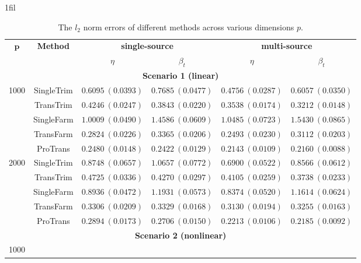\documentclass[12pt]{article}
\makeatletter
\newcommand*{\centerfloat}{%
  \parindent \z@
  \leftskip \z@ \@plus 1fil \@minus \marginparwidth
  \rightskip \leftskip
  \parfillskip \z@skip}
\makeatother
\begin{document}
\begin{table}[!ht]
\renewcommand{\arraystretch}{0.65}
\footnotesize
    \centerfloat
    \caption{The $l_2$ norm errors of different methods across various dimensions $p$.}
    \label{table: simulation_p}
    \begin{tabular}{cccccc}
        \toprule
        \multirow{2}{*}{$\bm{p}$} & \multirow{2}{*}{\textbf{Method}} & \multicolumn{2}{c}{\textbf{single-source}} & \multicolumn{2}{c}{\textbf{multi-source}}\\
        \cmidrule(lr){3-4} \cmidrule(lr){5-6} 
        & & $\eta$ & $\beta_{t}$ & $\eta$& $\beta_{t}$ \\
        \midrule
        \multicolumn{6}{c}{\textbf{Scenario 1 (linear)}}\\
        \hline
        \multirow{5}{*}{1000} 
        & SingleTrim  & $0.6095\ (0.0393)$ & $0.7685\ (0.0477)$ & $0.4756\ (0.0287)$ & $0.6057\ (0.0350)$ \\
        & TransTrim   & $0.4246\ (0.0247)$ & $0.3843\ (0.0220)$ & $0.3538\ (0.0174)$ & $0.3212\ (0.0148)$ \\
        & SingleFarm  & $1.0009\ (0.0490)$ & $1.4586\ (0.0609)$ & $1.0485\ (0.0723)$ & $1.5430\ (0.0865)$ \\
        & TransFarm   & $0.2824\ (0.0226)$ & $0.3365\ (0.0206)$ & $0.2493\ (0.0230)$ & $0.3112\ (0.0203)$ \\
        & ProTrans    & $\bm{0.2480}\ (0.0148)$ & $\bm{0.2422}\ (0.0129)$ & $\bm{0.2143}\ (0.0109)$ & $\bm{0.2160}\ (0.0088)$ \\
        \hline
        \multirow{5}{*}{2000} 
        & SingleTrim  & $0.8748\ (0.0657)$ & $1.0657\ (0.0772)$ & $0.6900\ (0.0522)$ & $0.8566\ (0.0612)$ \\
        & TransTrim   & $0.4725\ (0.0336)$ & $0.4270\ (0.0297)$ & $0.4105\ (0.0259)$ & $0.3738\ (0.0233)$ \\
        & SingleFarm  & $0.8936\ (0.0472)$ & $1.1931\ (0.0573)$ & $0.8374\ (0.0520)$ & $1.1614\ (0.0624)$ \\
        & TransFarm   & $0.3306\ (0.0209)$ & $0.3329\ (0.0168)$ & $0.3130\ (0.0194)$ & $0.3255\ (0.0163)$ \\
        & ProTrans    & $\bm{0.2894}\ (0.0173)$ & $\bm{0.2706}\ (0.0150)$ & $\bm{0.2213}\ (0.0106)$ & $\bm{0.2185}\ (0.0092)$ \\
        \hline
         \multicolumn{6}{c}{\textbf{Scenario 2 (nonlinear)}}\\
         \hline
        \multirow{5}{*}{1000} 

\end{tabular}
\end{table}
\end{document}
